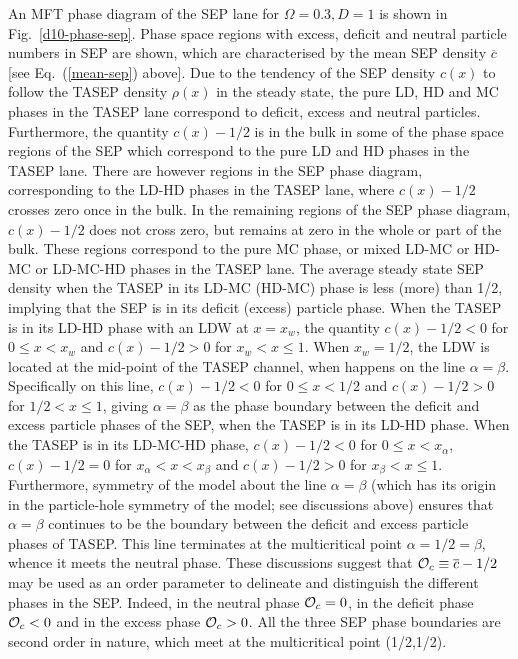 \documentclass[aps,pre,twocolumn,superscriptaddress,amsmath,amssymb,longbibliography,floatfix]{revtex4}
\begin{document}
{An MFT phase diagram of the SEP lane for $\Omega=0.3, D=1$ is shown in Fig.~\ref{d10-phase-sep}. Phase space regions with excess, deficit and neutral particle numbers in SEP are shown, which are characterised by the mean SEP density $\overline c$ [see Eq.~(\ref{mean-sep}) above]. Due to the tendency of the SEP density $c(x)$ to follow the TASEP density $\rho(x)$ in the steady state, the pure LD, HD and MC phases in the TASEP lane correspond to deficit, excess and neutral particles. Furthermore, the quantity $c(x)-1/2$ is in the bulk in some of the phase space regions of the SEP which correspond to the pure LD and HD phases  in the TASEP lane. There are however regions in the SEP phase diagram, corresponding to the LD-HD phases in the TASEP lane, where $c(x)-1/2$ crosses zero once in the bulk. In the remaining regions of the SEP phase diagram, $c(x)-1/2$ does not cross zero, but remains at zero in the whole or part of the bulk. These regions correspond to the pure MC phase, or mixed LD-MC or HD-MC or LD-MC-HD phases in the TASEP lane. The average steady state SEP density when the TASEP in its LD-MC (HD-MC) phase is less (more) than 1/2, implying that the SEP is in its deficit (excess) particle phase. When the TASEP is in its LD-HD phase with an LDW at $x=x_w$, the quantity $c(x)-1/2<0$ for $0\leq x< x_w$ and $c(x)-1/2>0$ for $x_w< x\leq 1$. When $x_w=1/2$, the LDW is located at the mid-point of the TASEP channel, when happens on the line $\alpha =\beta$. Specifically on this line,  $c(x)-1/2<0$ for $0\leq x< 1/2$ and $c(x)-1/2>0$ for $1/2< x\leq 1$, giving $\alpha=\beta$ as the phase boundary between the deficit and excess particle phases of the SEP, when the TASEP is in its LD-HD phase. When the TASEP is in its LD-MC-HD phase, $c(x)-1/2<0$ for $0\leq x<x_\alpha$, $c(x)-1/2=0$ for $x_\alpha<x<x_\beta$ and  $c(x)-1/2>0$ for $x_\beta<x\leq 1$. Furthermore, symmetry of the model about the line $\alpha=\beta$ (which has its origin in the particle-hole symmetry of the model; see discussions above) ensures that  $\alpha=\beta$ continues to be the boundary between the deficit and excess particle phases of TASEP. This line terminates at the multicritical point $\alpha=1/2=\beta$, whence it meets the neutral phase. These discussions suggest that ${\cal O}_c\equiv \overline c-1/2$ may be used as an order parameter to delineate and distinguish the different phases in the SEP. Indeed, in the neutral phase ${\cal O}_c=0$, in the deficit phase ${\cal O}_c<0$ and in the excess phase ${\cal O}_c>0$.  All the three SEP phase boundaries are second order in nature, which meet at the multicritical point (1/2,1/2).

}
\end{document}

